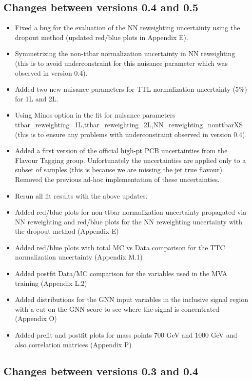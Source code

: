 \subsection{Changes between versions 0.4 and 0.5}

\begin{itemize}
  \item Fixed a bug for the evaluation of the NN reweighting uncertainty using the dropout method (updated red/blue plots in Appendix E).
  \item Symmetrizing the non-ttbar normalization uncertainty in NN reweighting (this is to avoid underconstraint for this nuisance parameter which was observed in version 0.4).
  \item Added two new nuisance parameters for TTL normalization uncertainty ($5\%$) for 1L and 2L.
  \item Using Minos option in the fit for nuisance parameters ttbar\_reweighting\_1L,ttbar\_reweighting\_2L,NN\_reweighting\_nonttbarXS (this is to ensure any problems with underconstraint observed in version 0.4).
  \item Added a first version of the official high-pt PCB uncertainties from the Flavour Tagging group. Unfortunately the uncertainties are applied only to a subset of samples (this is because we are missing the jet true flavour). Removed the previous ad-hoc implementation of these uncertainties.
  \item Rerun all fit results with the above updates.
  \item Added red/blue plots for non-ttbar normalization uncertainty propagated via NN reweighting and red/blue plots for the NN reweighting uncertainty with the dropout method (Appendix E)
  \item Added red/blue plots with total MC vs Data comparison for the TTC normalization uncertainty (Appendix M.1)
  \item Added postfit Data/MC comparison for the variables used in the MVA training (Appendix L.2)
  \item Added distributions for the GNN input variables in the inclusive signal region with a cut on the GNN score to see where the signal is concentrated (Appendix O)
  \item Added prefit and postfit plots for mass points 700 GeV and 1000 GeV and also correlation matrices (Appendix P)
\end{itemize}




\subsection{Changes between versions 0.3 and 0.4}

